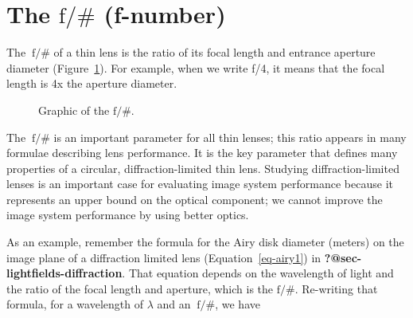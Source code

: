 \documentclass[
  letterpaper,
]{book}
\begin{document}
\section{\texorpdfstring{The \(\mathrm{f}/\#\)
(f-number)}{The \textbackslash mathrm\{f\}/\textbackslash\# (f-number)}}\label{sec-optics-fnumber}

The \(~\mathrm{f}/\#\) of a thin lens is the ratio of its focal length
and entrance aperture diameter (Figure~\ref{fig-fnumber}). For example,
when we write f/4, it means that the focal length is 4x the aperture
diameter.

\begin{figure}


\caption{\label{fig-fnumber}Graphic of the \(\mathrm{f}/\#\).}

\end{figure}%

The \(~\mathrm{f}/\#\) is an important parameter for all thin lenses;
this ratio appears in many formulae describing lens performance. It is
the key parameter that defines many properties of a circular,
diffraction-limited thin lens. Studying diffraction-limited lenses is an
important case for evaluating image system performance because it
represents an upper bound on the optical component; we cannot improve
the image system performance by using better optics.

As an example, remember the formula for the Airy disk diameter (meters)
on the image plane of a diffraction limited lens
(Equation~\ref{eq-airy1}) in \textbf{?@sec-lightfields-diffraction}.
That equation depends on the wavelength of light and the ratio of the
focal length and aperture, which is the \(\mathrm{f}/\#\). Re-writing
that formula, for a wavelength of \(\lambda\) and an \(~\mathrm{f}/\#\),
we have
\end{document}
